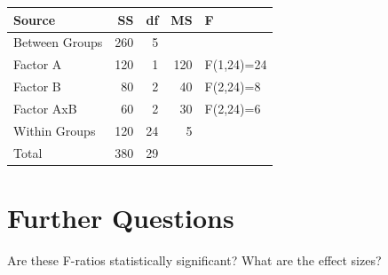 \documentclass{tufte-handout}
\begin{document}
\begin{table}
  \centering
  \selectfont
  \begin{tabular}{lrrrl}
    \toprule
    Source &  SS &  df &  MS &  F \\
    \midrule
    Between Groups & 260 & 5 & & \\
    \qquad Factor A & 120 & 1 & 120 & F(1,24)=24 \\
    \qquad Factor B & 80 & 2 & 40 & F(2,24)=8 \\
    \qquad Factor AxB & 60 & 2 & 30 & F(2,24)=6 \\
    Within Groups & 120 & 24 & 5 & \\
    Total & 380 & 29  & & \\
    \bottomrule
  \end{tabular}
  \label{tab:normaltab}
\end{table}

\section{Further Questions}
Are these F-ratios statistically significant? What are the effect sizes?
\end{document}
